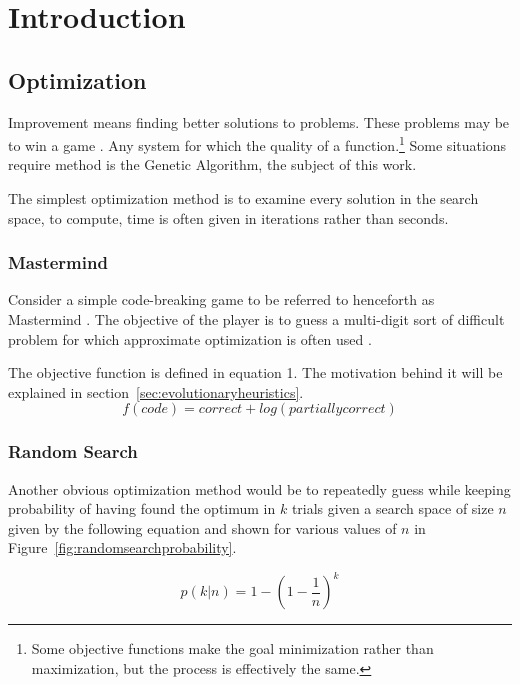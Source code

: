 \chapter{Introduction}\label{ch:introduction}
\section{Optimization}

Improvement means finding better solutions to problems.  These problems may be to win a game \cite{re:mri}\cite{re:lightbot}.  Any system for which the quality of a  function.\footnote{Some objective functions make the goal minimization rather than maximization, but the process is effectively the same.}  Some situations require  method is the Genetic Algorithm, the subject of this work.  

The simplest optimization method is to examine every solution in the search space, to compute, time is often given in iterations rather than seconds.

\subsection{Mastermind}
Consider a simple code-breaking game to be referred to henceforth as Mastermind \cite{re:mastermind}.  The objective of the player is to guess a multi-digit sort of difficult problem for which approximate optimization is often used \cite{re:knuth}\cite{re:stuckman}.

The objective function is defined in equation 1.  The motivation behind it will be explained in section~\ref{sec:evolutionaryheuristics}.
	\begin{equation}
		\label{eq:mastermindfitness}
		f(code) = correct + log(partially correct)
	\end{equation}

\subsection{Random Search}
Another obvious optimization method would be to repeatedly guess while keeping probability of having found the optimum in $k$ trials given a search space of size $n$ given by the following equation and shown for various values of $n$ in Figure~\ref{fig:randomsearchprobability}.  
 
	\begin{equation}
		p(k|n) = 1 - \left(1 - \frac{1}{n}\right)^k
	\end{equation}
	
